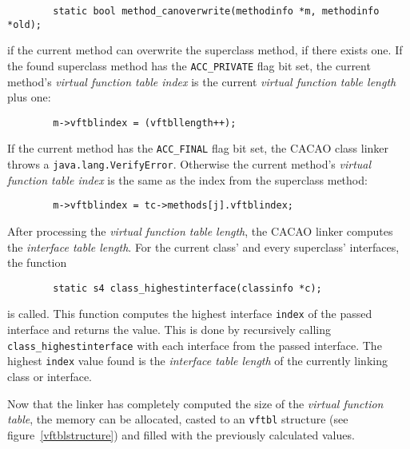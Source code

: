 \begin{verbatim}
        static bool method_canoverwrite(methodinfo *m, methodinfo *old);
\end{verbatim}

if the current method can overwrite the superclass method, if there
exists one. If the found superclass method has the
\texttt{ACC\_PRIVATE} flag bit set, the current method's
\textit{virtual function table index} is the current \textit{virtual
function table length} plus one:

\begin{verbatim}
        m->vftblindex = (vftbllength++);
\end{verbatim}

If the current method has the \texttt{ACC\_FINAL} flag bit set, the
CACAO class linker throws a \texttt{java.lang.VerifyError}. Otherwise
the current method's \textit{virtual function table index} is the same
as the index from the superclass method:

\begin{verbatim}
        m->vftblindex = tc->methods[j].vftblindex;
\end{verbatim}

After processing the \textit{virtual function table length}, the CACAO
linker computes the \textit{interface table length}. For the current
class' and every superclass' interfaces, the function

\begin{verbatim}
        static s4 class_highestinterface(classinfo *c);
\end{verbatim}

is called. This function computes the highest interface \texttt{index}
of the passed interface and returns the value. This is done by
recursively calling \texttt{class\_highestinterface} with each
interface from the passed interface. The highest \texttt{index} value
found is the \textit{interface table length} of the currently linking
class or interface.

Now that the linker has completely computed the size of the
\textit{virtual function table}, the memory can be allocated, casted
to an \texttt{vftbl} structure (see figure~\ref{vftblstructure}) and
filled with the previously calculated values.

